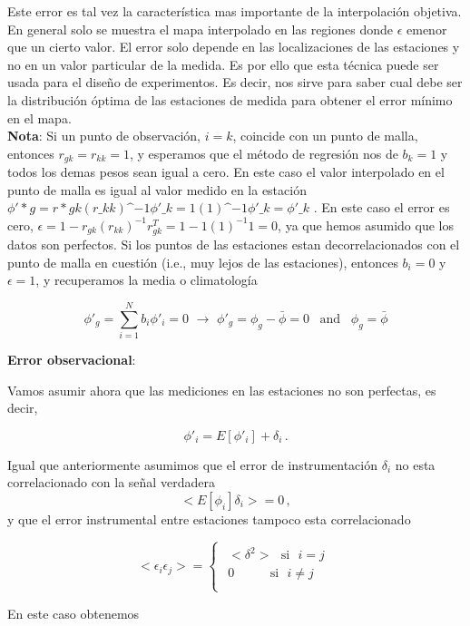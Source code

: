 \documentclass[
]{agujournal2019}
\begin{document}
Este error es tal vez la característica mas importante de la
interpolación objetiva. En general solo se muestra el mapa interpolado
en las regiones donde \(\epsilon\) emenor que un cierto valor. El error
solo depende en las localizaciones de las estaciones y no en un valor
particular de la medida. Es por ello que esta técnica puede ser usada
para el diseño de experimentos. Es decir, nos sirve para saber cual debe
ser la distribución óptima de las estaciones de medida para obtener el
error mínimo en el mapa.\\

\textbf{Nota}: Si un punto de observación, \(i=k\), coincide con un
punto de malla, entonces \(r_{gk}=r_{kk}=1\), y esperamos que el método
de regresión nos de \(b_k=1\) y todos los demas pesos sean igual a cero.
En este caso el valor interpolado en el punto de malla es igual al valor
medido en la estación
\(\phi'*g = r*{gk} (r\_{kk})\^{-1} \phi'\_k =1(1)\^{-1}\phi'\_k=\phi'\_k\)
. En este caso el error es cero,
\(\epsilon=1-r_{gk}(r_{kk})^{-1}r^T_{gk}=1-1(1)^{-1}1=0\), ya que hemos
asumido que los datos son perfectos. Si los puntos de las estaciones
estan decorrelacionados con el punto de malla en cuestión (i.e., muy
lejos de las estaciones), entonces \(b_i=0\) y \(\epsilon=1\), y
recuperamos la media o climatología

\[\phi'_g=\sum\limits^N_{i=1}b_i\phi'_i=0\,\,\rightarrow\,\,\phi'_g=\phi_g-\bar{\phi}=0\,\,\,\,\,\text{and}\,\,\,\,\,\phi_g=\bar{\phi}\]

\textbf{Error observacional}:

Vamos asumir ahora que las mediciones en las estaciones no son
perfectas, es decir,

\[\phi'_i=E[\phi'_i] + \delta_i\,.\]

Igual que anteriormente asumimos que el error de instrumentación
\(\delta_i\) no esta correlacionado con la señal verdadera
\[<E[\phi_i]\delta_i>=0\,,\] y que el error instrumental entre
estaciones tampoco esta correlacionado

\[<\epsilon_i \epsilon_j>=
\begin{cases}
\begin{array}{c}
   <\delta^2> \,\,\,\,\text{si}\,\,\,\,i=j\\
        0     \,\,\,\,\,\,\,\,\,\,\,\,\,\,\,\,\,\text{si}\,\,\,\,i\ne j\\
\end{array}
\end{cases}\]

En este caso obtenemos
\end{document}
